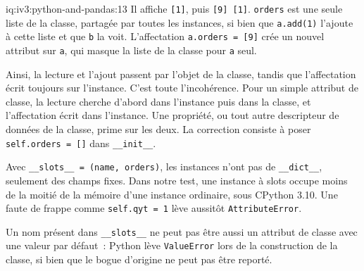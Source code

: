 \begin{solution}{iq:iv3:python-and-pandas:13}
Il affiche \texttt{[1]}, puis \texttt{[9] [1]}. \texttt{orders} est une seule liste de la classe, partagée par toutes les instances, si bien que \texttt{a.add(1)} l'ajoute à cette liste et que \texttt{b} la voit. L'affectation \texttt{a.orders = [9]} crée un nouvel attribut sur \texttt{a}, qui masque la liste de la classe pour \texttt{a} seul.

Ainsi, la lecture et l'ajout passent par l'objet de la classe, tandis que l'affectation écrit toujours sur l'instance. C'est toute l'incohérence. Pour un simple attribut de classe, la lecture cherche d'abord dans l'instance puis dans la classe, et l'affectation écrit dans l'instance. Une propriété, ou tout autre descripteur de données de la classe, prime sur les deux. La correction consiste à poser \texttt{self.orders = []} dans \texttt{\_\_init\_\_}.

Avec \texttt{\_\_slots\_\_ = (\textquotesingle name\textquotesingle, \textquotesingle orders\textquotesingle)}, les instances n'ont pas de \texttt{\_\_dict\_\_}, seulement des champs fixes. Dans notre test, une instance à slots occupe moins de la moitié de la mémoire d'une instance ordinaire, sous CPython 3.10. Une faute de frappe comme \texttt{self.qyt = 1} lève aussitôt \texttt{AttributeError}.

Un nom présent dans \texttt{\_\_slots\_\_} ne peut pas être aussi un attribut de classe avec une valeur par défaut~: Python lève \texttt{ValueError} lors de la construction de la classe, si bien que le bogue d'origine ne peut pas être reporté.

\end{solution}

